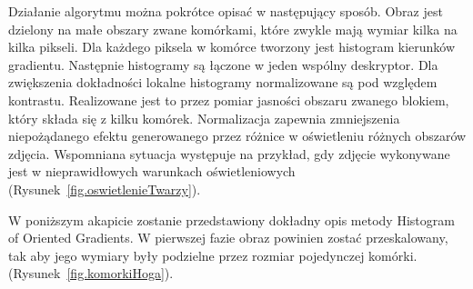 \documentclass[a4paper,twoside,12pt]{book}
\begin{document}
    Działanie algorytmu można pokrótce opisać w następujący sposób. Obraz jest dzielony na małe obszary zwane komórkami, które zwykle mają wymiar kilka na kilka pikseli.
    Dla każdego piksela w komórce tworzony jest histogram kierunków gradientu.
    Następnie histogramy są łączone w jeden wspólny deskryptor.
    Dla zwiększenia dokładności lokalne histogramy normalizowane są pod względem kontrastu.
    Realizowane jest to przez pomiar jasności obszaru zwanego blokiem, który
    składa się z kilku komórek. Normalizacja zapewnia zmniejszenia niepożądanego efektu generowanego przez
    różnice w oświetleniu różnych obszarów zdjęcia. Wspomniana sytuacja występuje na przykład, gdy zdjęcie wykonywane
    jest w nieprawidłowych warunkach oświetleniowych (Rysunek~\ref{fig.oswietlenieTwarzy}).

    W poniższym akapicie zostanie przedstawiony dokładny opis metody Histogram of Oriented Gradients.
    W pierwszej fazie obraz powinien zostać przeskalowany, tak aby jego wymiary były podzielne przez rozmiar
    pojedynczej komórki.
    (Rysunek~\ref{fig.komorkiHoga}).
\end{document}
